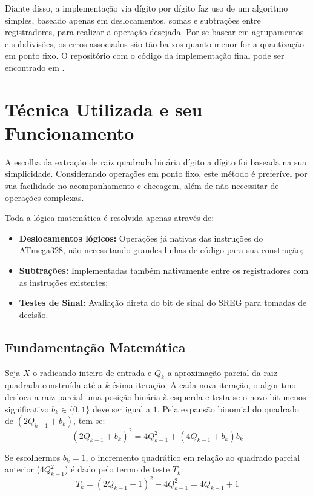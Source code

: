 \documentclass[conference]{IEEEtran}
\begin{document}
Diante disso, a implementação via dígito por dígito faz uso de um algoritmo simples, baseado apenas em deslocamentos, somas e subtrações entre registradores, para realizar a operação desejada. Por se basear em agrupamentos e subdivisões, os erros associados são tão baixos quanto menor for a quantização em ponto fixo. O repositório com o código da implementação final pode ser encontrado em \cite{monteiro_sismicro}.

\section{Técnica Utilizada e seu Funcionamento}
A escolha da extração de raiz quadrada binária dígito a dígito foi baseada na sua simplicidade. Considerando operações em ponto fixo, este método é preferível por sua facilidade no acompanhamento e checagem, além de não necessitar de operações complexas.

Toda a lógica matemática é resolvida apenas através de:
\begin{itemize}
    \item \textbf{Deslocamentos lógicos:} Operações já nativas das instruções do ATmega328, não necessitando grandes linhas de código para sua construção;
    \item \textbf{Subtrações:} Implementadas também nativamente entre os registradores com as instruções existentes;
    \item \textbf{Testes de Sinal:} Avaliação direta do bit de sinal do SREG para tomadas de decisão.
\end{itemize}

\subsection{Fundamentação Matemática}
Seja $X$ o radicando inteiro de entrada e $Q_k$ a aproximação parcial da raiz quadrada construída até a $k$-ésima iteração. A cada nova iteração, o algoritmo desloca a raiz parcial uma posição binária à esquerda e testa se o novo bit menos significativo $b_k \in \{0, 1\}$ deve ser igual a $1$. Pela expansão binomial do quadrado de $(2Q_{k-1} + b_k)$, tem-se:
\begin{equation}
	(2Q_{k-1} + b_k)^2 = 4Q_{k-1}^2 + (4Q_{k-1} + b_k)b_k
	\label{eq:binomial}
\end{equation}

Se escolhermos $b_k = 1$, o incremento quadrático em relação ao quadrado parcial anterior ($4Q_{k-1}^2$) é dado pelo termo de teste $T_k$:
\begin{equation}
	T_k = (2Q_{k-1} + 1)^2 - 4Q_{k-1}^2 = 4Q_{k-1} + 1
	\label{eq:termo_teste}
\end{equation}
\end{document}

